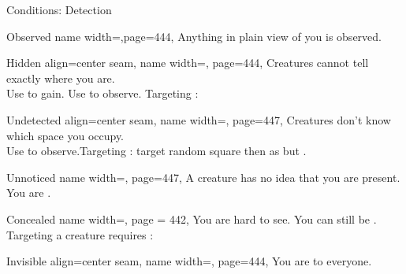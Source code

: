 \begin{PageFront}
\begin{Tables}{\frontTableHeight}
\begin{Table}{Conditions: Detection}
            \begin{entry}{Observed}{%
                name width=\conditionLength,page=444,}
                Anything in plain view of you is observed.
            \end{entry}
            \begin{entry}{Hidden}{%
                align=center seam,
                name width=\conditionLength,%
                page=444,
            }%
                Creatures cannot tell exactly where you are. \hfill {}
                \\Use {} to gain. Use  to observe. \hfill Targeting \Hidden\hspace{0.1ex}: \Flat[][val=11] 
            \end{entry}
            \begin{entry}{Undetected}{%
                align=center seam,
                name width=\conditionLength,%
                page=447,
            }
                Creatures don't know which space you occupy. \hfill {}
                \\
                Use  to observe.\hfill Targeting \Undetected: target random square then as \Hidden but
                \Se. 
            \end{entry}
            \begin{entry}{Unnoticed}{%
                name width=\conditionLength,%
                page=447,
            }
                A creature has no idea that you are present. You are \Undetected.
            \end{entry}
            \breakLine
            \begin{entry}{Concealed}{%
                name width=\conditionLength,%
                page = 442,
            }
                You are hard to see. You can still be \Observed. \hfill Targeting a \Concealed creature requires
                : \Flat[][val=5] 
            \end{entry}
            \begin{entry}{Invisible}{%
                align=center seam,
                name width=\conditionLength,%
                page=444,
            }
                You are \Undetected to everyone. \hfill {}
\end{entry}
\end{Table}
\end{Tables}
\end{PageFront}
